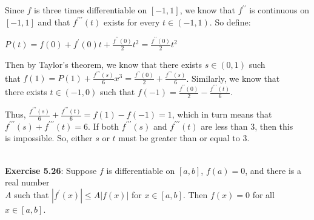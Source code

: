 \documentclass{book}
\newcommand{\pracTwo}{
   \color{Orange}%
   \fontsize{12}{14}\selectfont%
}
\newenvironment{myIndent}{%
   \begin{adjustwidth}{2.5em}{0em}%
}{%
   \end{adjustwidth}%
}
\newcommand{\pprime}{{\prime\prime}}
\newcommand{\ppprime}{{\prime\prime\prime}}
\newcommand{\mySepTwo}[1][.]{%
   {\noindent\color{#1}{\rule{6.5in}{0.5mm}}}\\%
}
\newcommand{\retTwo}{\hfill\bigbreak}
\begin{document}
{\begin{myIndent}\pracTwo
   Since $f$ is three times differentiable on $[-1, 1]$, we know that $f^\pprime$ is continuous on\\ $[-1, 1]$ and that $f^\ppprime(t)$ exists for every $t \in (-1, 1)$. So define:

   {\center $P(t) = f(0) + f^\prime(0)t + \frac{f^\pprime(0)}{2}t^2 = \frac{f^\pprime(0)}{2}t^2$ \retTwo\par}

   Then by Taylor's theorem, we know that there exists $s \in (0, 1)$ such\\ [2pt] that $f(1) = P(1) + \frac{f^\ppprime(s)}{6}x^3 = \frac{f^\pprime(0)}{2} + \frac{f^\ppprime(s)}{6}$. Similarly, we know that\\ [2pt] there exists $t \in (-1, 0)$ such that $f(-1) = \frac{f^\pprime(0)}{2} - \frac{f^\ppprime(t)}{6}$.\retTwo

   Thus, $\frac{f^\ppprime(s)}{6} + \frac{f^\ppprime(t)}{6} = f(1) - f(-1) = 1$, which in turn means that\\ [2pt] $f^\ppprime(s) + f^\ppprime(t) = 6$. If both $f^\ppprime(s)$ and $f^\ppprime(t)$ are less than $3$, then this\\ [2pt] is impossible. So, either $s$ or $t$ must be greater than or equal to $3$.\retTwo
\end{myIndent}}

\mySepTwo[Black]

\textbf{Exercise 5.26}: Suppose $f$ is differentiable on $[a, b]$, $f(a) = 0$, and there is a real number\\ $A$ such that $|f^\prime(x)| \leq A|f(x)|$ for $x \in [a, b]$. Then $f(x) = 0$ for all $x \in [a, b]$.\\ [-8pt]
\end{document}
